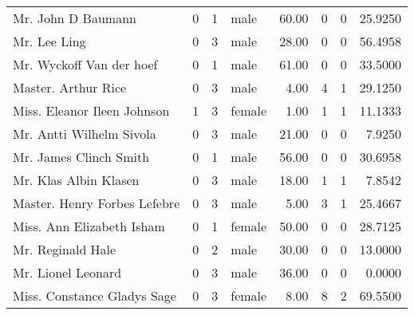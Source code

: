 \begin{tabular}{lrrlrrrr}
Mr. John D Baumann                                 &         0 &       1 &    male &  60.00 &                        0 &                        0 &   25.9250 \\
Mr. Lee Ling                                       &         0 &       3 &    male &  28.00 &                        0 &                        0 &   56.4958 \\
Mr. Wyckoff Van der hoef                           &         0 &       1 &    male &  61.00 &                        0 &                        0 &   33.5000 \\
Master. Arthur Rice                                &         0 &       3 &    male &   4.00 &                        4 &                        1 &   29.1250 \\
Miss. Eleanor Ileen Johnson                        &         1 &       3 &  female &   1.00 &                        1 &                        1 &   11.1333 \\
Mr. Antti Wilhelm Sivola                           &         0 &       3 &    male &  21.00 &                        0 &                        0 &    7.9250 \\
Mr. James Clinch Smith                             &         0 &       1 &    male &  56.00 &                        0 &                        0 &   30.6958 \\
Mr. Klas Albin Klasen                              &         0 &       3 &    male &  18.00 &                        1 &                        1 &    7.8542 \\
Master. Henry Forbes Lefebre                       &         0 &       3 &    male &   5.00 &                        3 &                        1 &   25.4667 \\
Miss. Ann Elizabeth Isham                          &         0 &       1 &  female &  50.00 &                        0 &                        0 &   28.7125 \\
Mr. Reginald Hale                                  &         0 &       2 &    male &  30.00 &                        0 &                        0 &   13.0000 \\
Mr. Lionel Leonard                                 &         0 &       3 &    male &  36.00 &                        0 &                        0 &    0.0000 \\
Miss. Constance Gladys Sage                        &         0 &       3 &  female &   8.00 &                        8 &                        2 &   69.5500 \\

\end{tabular}
